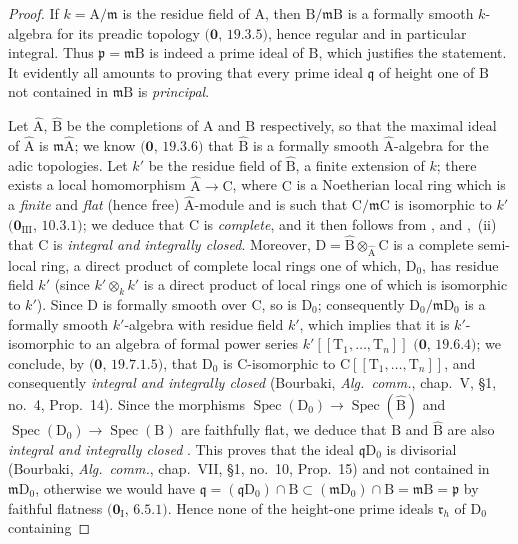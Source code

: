 \begin{proof}
If $k=\mathrm{A}/\mathfrak{m}$ is the residue field of $\mathrm{A}$, then $\mathrm{B}/\mathfrak{m}\mathrm{B}$ is a formally smooth $k$-algebra for its preadic topology $(\mathbf{0}$, $19.3.5)$, hence regular and in particular integral. Thus $\mathfrak{p}=\mathfrak{m}\mathrm{B}$ is indeed a prime ideal of $\mathrm{B}$, which justifies the statement.
It evidently all amounts to proving that every prime ideal $\mathfrak{q}$ of height one of $\mathrm{B}$ not contained in $\mathfrak{m}\mathrm{B}$ is \emph{principal}.

Let $\widehat{\mathrm{A}}$, $\widehat{\mathrm{B}}$ be the completions of $\mathrm{A}$ and $\mathrm{B}$ respectively, so that the maximal ideal of $\widehat{\mathrm{A}}$ is $\mathfrak{m}\widehat{\mathrm{A}}$; we know $(\mathbf{0}$, $19.3.6)$ that $\widehat{\mathrm{B}}$ is a formally smooth $\widehat{\mathrm{A}}$-algebra for the adic topologies. Let $k'$ be the residue field of $\widehat{\mathrm{B}}$, a finite extension of $k$; there exists a local homomorphism $\widehat{\mathrm{A}}\to\mathrm{C}$, where $\mathrm{C}$ is a Noetherian local ring which is a \emph{finite} and \emph{flat} (hence free) $\widehat{\mathrm{A}}$-module and is such that $\mathrm{C}/\mathfrak{m}\mathrm{C}$ is isomorphic to $k'$ $(\mathbf{0}_{\mathrm{III}}$, $10.3.1)$; we deduce that $\mathrm{C}$ is \emph{complete}, and it then follows from ,  and ,~(ii) that $\mathrm{C}$ is \emph{integral and integrally closed}. Moreover, $\mathrm{D}=\widehat{\mathrm{B}}\otimes_{\widehat{\mathrm{A}}}\mathrm{C}$ is a complete semi-local ring, a direct product of complete local rings one of which, $\mathrm{D}_0$, has residue field $k'$ (since $k'\otimes_k k'$ is a direct product of local rings one of which is isomorphic to $k'$). Since $\mathrm{D}$ is formally smooth over $\mathrm{C}$, so is $\mathrm{D}_0$; consequently $\mathrm{D}_0/\mathfrak{m}\mathrm{D}_0$ is a formally smooth $k'$-algebra with residue field $k'$, which implies that it is $k'$-isomorphic to an algebra of formal power series $k'[[\mathrm{T}_1,\ldots,\mathrm{T}_n]]$ $(\mathbf{0}$, $19.6.4)$; we conclude, by $(\mathbf{0}$, $19.7.1.5)$, that $\mathrm{D}_0$ is $\mathrm{C}$-isomorphic to $\mathrm{C}[[\mathrm{T}_1,\ldots,\mathrm{T}_n]]$, and consequently \emph{integral and integrally closed} (Bourbaki, \emph{Alg.\ comm.}, chap.~V, \S1, no.~4, Prop.~14). Since the morphisms $\operatorname{Spec}(\mathrm{D}_0)\to\operatorname{Spec}(\widehat{\mathrm{B}})$ and $\operatorname{Spec}(\mathrm{D}_0)\to\operatorname{Spec}(\mathrm{B})$ are faithfully flat, we deduce that $\mathrm{B}$ and $\widehat{\mathrm{B}}$ are also \emph{integral and integrally closed} . This proves that the ideal $\mathfrak{q}\mathrm{D}_0$ is divisorial (Bourbaki, \emph{Alg.\ comm.}, chap.~VII, \S1, no.~10, Prop.~15) and not contained in $\mathfrak{m}\mathrm{D}_0$, otherwise we would have $\mathfrak{q}=(\mathfrak{q}\mathrm{D}_0)\cap\mathrm{B}\subset(\mathfrak{m}\mathrm{D}_0)\cap\mathrm{B}=\mathfrak{m}\mathrm{B}=\mathfrak{p}$ by faithful flatness $(\mathbf{0}_{\mathrm{I}}$, $6.5.1)$. Hence none of the height-one prime ideals $\mathfrak{r}_h$ of $\mathrm{D}_0$ containing 
\end{proof}
